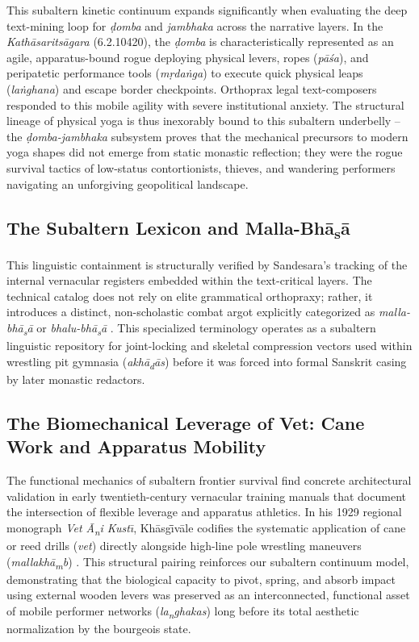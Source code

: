 \documentclass[11pt,twoside,letterpaper]{article}
\begin{document}
This subaltern kinetic continuum expands significantly when evaluating the deep text-mining loop for \textit{ḍomba} and \textit{jambhaka} across the narrative layers. In the \textit{Kathāsaritsāgara} (6.2.10420), the \textit{ḍomba} is characteristically represented as an agile, apparatus-bound rogue deploying physical levers, ropes (\textit{pāśa}), and peripatetic performance tools (\textit{mṛdaṅga}) to execute quick physical leaps (\textit{laṅghana}) and escape border checkpoints. Orthoprax legal text-composers responded to this mobile agility with severe institutional anxiety. The structural lineage of physical yoga is thus inexorably bound to this subaltern underbelly -- the \textit{ḍomba-jambhaka} subsystem proves that the mechanical precursors to modern yoga shapes did not emerge from static monastic reflection; they were the rogue survival tactics of low-status contortionists, thieves, and wandering performers navigating an unforgiving geopolitical landscape.

\subsection{The Subaltern Lexicon and Malla-Bh\={a}\textsubscript{s}\={a}}
This linguistic containment is structurally verified by Sandesara's tracking of the internal vernacular registers embedded within the text-critical layers. The technical catalog does not rely on elite grammatical orthopraxy; rather, it introduces a distinct, non-scholastic combat argot explicitly categorized as \textit{malla-bh\={a}\textsubscript{s}\={a}} or \textit{bhalu-bh\={a}\textsubscript{s}\={a}} \cite{Sandesara1948}. This specialized terminology operates as a subaltern linguistic repository for joint-locking and skeletal compression vectors used within wrestling pit gymnasia (\textit{akh\={a}\textsubscript{d}\={a}s}) before it was forced into formal Sanskrit casing by later monastic redactors.

\subsection{The Biomechanical Leverage of Vet: Cane Work and Apparatus Mobility}
The functional mechanics of subaltern frontier survival find concrete architectural validation in early twentieth-century vernacular training manuals that document the intersection of flexible leverage and apparatus athletics. In his 1929 regional monograph \textit{Vet \={A}\textsubscript{n}i Kust\={\i}}, Kh\={a}sg\={\={\i}}v\={a}le codifies the systematic application of cane or reed drills (\textit{vet}) directly alongside high-line pole wrestling maneuvers (\textit{mallakh\={a}\textsubscript{m}b}) \cite{Khasgivale1929}. This structural pairing reinforces our subaltern continuum model, demonstrating that the biological capacity to pivot, spring, and absorb impact using external wooden levers was preserved as an interconnected, functional asset of mobile performer networks (\textit{la\textsubscript{n}ghakas}) long before its total aesthetic normalization by the bourgeois state.
\end{document}
